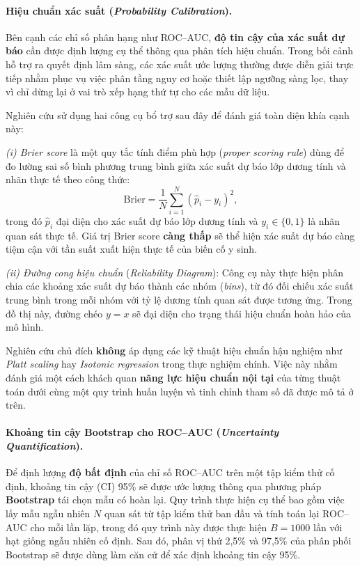 \documentclass[14pt,a4paper]{extreport}
\begin{document}
\paragraph{Hiệu chuẩn xác suất (\textit{Probability Calibration}).}
Bên cạnh các chỉ số phân hạng như ROC--AUC, \textbf{độ tin cậy của xác suất dự báo} cần được định lượng cụ thể thông qua phân tích hiệu chuẩn. Trong bối cảnh hỗ trợ ra quyết định lâm sàng, các xác suất ước lượng thường được diễn giải trực tiếp nhằm phục vụ việc phân tầng nguy cơ hoặc thiết lập ngưỡng sàng lọc, thay vì chỉ dừng lại ở vai trò xếp hạng thứ tự cho các mẫu dữ liệu.

Nghiên cứu sử dụng hai công cụ bổ trợ sau đây để đánh giá toàn diện khía cạnh này:

\textit{(i) Brier score} là một quy tắc tính điểm phù hợp (\textit{proper scoring rule}) dùng để đo lường sai số bình phương trung bình giữa xác suất dự báo lớp dương tính và nhãn thực tế theo công thức:
\begin{equation}
\mathrm{Brier} = \frac{1}{N}\sum_{i=1}^{N}(\hat{p}_i - y_i)^2,
\end{equation}
trong đó $\hat{p}_i$ đại diện cho xác suất dự báo lớp dương tính và $y_i \in \{0,1\}$ là nhãn quan sát thực tế. Giá trị Brier score \textbf{càng thấp} sẽ thể hiện xác suất dự báo càng tiệm cận với tần suất xuất hiện thực tế của biến cố y sinh.

\textit{(ii) Đường cong hiệu chuẩn} (\textit{Reliability Diagram}): Công cụ này thực hiện phân chia các khoảng xác suất dự báo thành các nhóm (\textit{bins}), từ đó đối chiếu xác suất trung bình trong mỗi nhóm với tỷ lệ dương tính quan sát được tương ứng. Trong đồ thị này, đường chéo $y=x$ sẽ đại diện cho trạng thái hiệu chuẩn hoàn hảo của mô hình.

Nghiên cứu chủ đích \textbf{không} áp dụng các kỹ thuật hiệu chuẩn hậu nghiệm như \textit{Platt scaling} hay \textit{Isotonic regression} trong thực nghiệm chính. Việc này nhằm đánh giá một cách khách quan \textbf{năng lực hiệu chuẩn nội tại} của từng thuật toán dưới cùng một quy trình huấn luyện và tinh chỉnh tham số đã được mô tả ở trên.

\paragraph{Khoảng tin cậy Bootstrap cho ROC--AUC (\textit{Uncertainty Quantification}).}
Để định lượng \textbf{độ bất định} của chỉ số ROC--AUC trên một tập kiểm thử cố định, khoảng tin cậy (CI) 95\% sẽ được ước lượng thông qua phương pháp \textbf{Bootstrap} tái chọn mẫu có hoàn lại. Quy trình thực hiện cụ thể bao gồm việc lấy mẫu ngẫu nhiên $N$ quan sát từ tập kiểm thử ban đầu và tính toán lại ROC--AUC cho mỗi lần lặp, trong đó quy trình này được thực hiện $B=1000$ lần với hạt giống ngẫu nhiên cố định. Sau đó, phân vị thứ 2,5\% và 97,5\% của phân phối Bootstrap sẽ được dùng làm căn cứ để xác định khoảng tin cậy 95\%.
\end{document}
